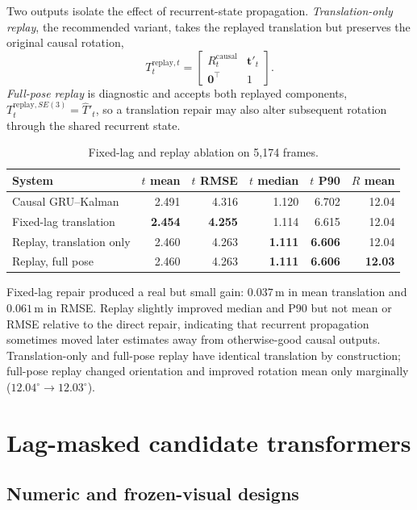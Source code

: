 \documentclass[11pt]{article}
\newcommand{\best}[1]{\textbf{#1}}
\newcommand{\unitm}{\,\mathrm{m}}
\newcommand{\unitdeg}{^{\circ}}
\begin{document}
Two outputs isolate the effect of recurrent-state propagation.  \emph{Translation-only replay}, the recommended variant, takes the replayed translation but preserves the original causal rotation,
\begin{equation}
T_t^{\mathrm{replay},t}=\begin{bmatrix}R_t^{\mathrm{causal}}&\bm t'_t\\\bm 0^\top&1\end{bmatrix}.
\end{equation}
\emph{Full-pose replay} is diagnostic and accepts both replayed components,
$T_t^{\mathrm{replay},SE(3)}=\hat T'_t$, so a translation repair may also alter subsequent rotation through the shared recurrent state.

\begin{table}[H]
\centering
\caption{Fixed-lag and replay ablation on 5,174 frames.}
\begin{tabular}{lrrrrr}
\toprule
System & $t$ mean & $t$ RMSE & $t$ median & $t$ P90 & $R$ mean\\
\midrule
Causal GRU--Kalman & 2.491 & 4.316 & 1.120 & 6.702 & 12.04\\
Fixed-lag translation & \best{2.454} & \best{4.255} & 1.114 & 6.615 & 12.04\\
Replay, translation only & 2.460 & 4.263 & \best{1.111} & \best{6.606} & 12.04\\
Replay, full pose & 2.460 & 4.263 & \best{1.111} & \best{6.606} & \best{12.03}\\
\bottomrule
\end{tabular}
\end{table}

Fixed-lag repair produced a real but small gain: $0.037\unitm$ in mean translation and $0.061\unitm$ in RMSE.  Replay slightly improved median and P90 but not mean or RMSE relative to the direct repair, indicating that recurrent propagation sometimes moved later estimates away from otherwise-good causal outputs.  Translation-only and full-pose replay have identical translation by construction; full-pose replay changed orientation and improved rotation mean only marginally ($12.04\unitdeg\rightarrow12.03\unitdeg$).

\section{Lag-masked candidate transformers}

\subsection{Numeric and frozen-visual designs}
\end{document}
